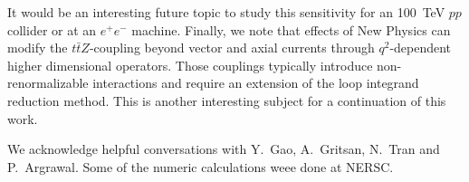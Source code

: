\documentclass[preprint]{JHEP3} %
\def\ttbZ{t\bar{t}Z}
\begin{document}
It would be an interesting future topic to study this sensitivity for an 100~TeV $pp$ collider or at an $e^+ e^-$ machine.
Finally, we note that effects of New Physics can modify the $\ttbZ$-coupling beyond vector and axial currents through $q^2$-dependent  higher dimensional operators. 
Those couplings typically introduce non-renormalizable interactions and require an extension of the loop integrand reduction method. 
This is another interesting subject for a continuation of this work.




\acknowledgments
We acknowledge helpful conversations with Y.~Gao, A.~Gritsan, N.~Tran and P.~Argrawal. 
Some of the numeric calculations weee done at NERSC.





\end{document}
